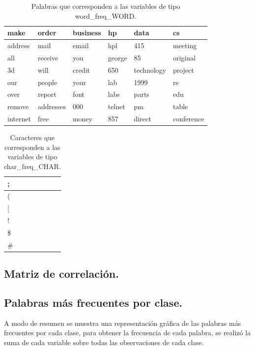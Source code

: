\documentclass[12pt, letterpaper]{article}
\begin{document}
\begin{table}[ht]
\centering
\begin{tabular}{|l|l|l|l|l|l|}
\hline
make     & order     & business & hp     & data       & cs         \\ \hline
address  & mail      & email    & hpl    & 415        & meeting    \\ \hline
all      & receive   & you      & george & 85         & original   \\ \hline
3d       & will      & credit   & 650    & technology & project    \\ \hline
our      & people    & your     & lab    & 1999       & re         \\ \hline
over     & report    & font     & labs   & parts      & edu        \\ \hline
remove   & addresses & 000      & telnet & pm         & table      \\ \hline
internet & free      & money    & 857    & direct     & conference \\ \hline
\end{tabular}
\caption{Palabras que corresponden a las variables de tipo word\_freq\_WORD.}
\end{table}

\begin{table}[ht]
\centering
\begin{tabular}{|l|}
\hline
;   \\ \hline
(   \\ \hline
{[} \\ \hline
!   \\ \hline
\$  \\ \hline
\#  \\ \hline
\end{tabular}
\caption{Caracteres que corresponden a las variables de tipo char\_freq\_CHAR.}
\end{table}

\subsection{Matriz de correlación.}

\subsection{Palabras más frecuentes por clase.}

A modo de resumen se muestra una representación gráfica de las palabras más frecuentes por cada clase, para obtener la frecuencia de cada palabra, se realizó la suma de cada variable sobre todas las observaciones de cada clase.
\end{document}
